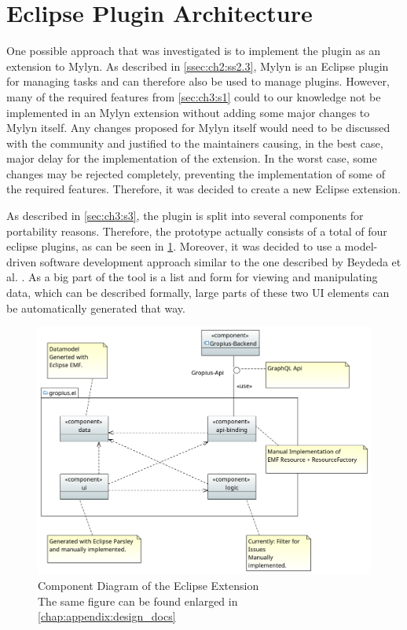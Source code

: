 \section{Eclipse Plugin Architecture}
\label{sec:ch4:s3}
One possible approach that was investigated is to implement the plugin as an extension to Mylyn.
As described in \cref{ssec:ch2:ss2.3}, Mylyn is an \gls{Eclipse} plugin for managing tasks and can therefore also be used to manage plugins.
However, many of the required features from \cref{sec:ch3:s1} could to our knowledge not be implemented in an Mylyn extension without adding some major changes to Mylyn itself.
Any changes proposed for Mylyn itself would need to be discussed with the community and justified to the maintainers causing, in the best case, major delay for the implementation of the extension.
In the worst case, some changes may be rejected completely, preventing the implementation of some of the required features.
Therefore, it was decided to create a new \gls{Eclipse} extension.

As described in \cref{sec:ch3:s3}, the plugin is split into several components for portability reasons.
Therefore, the prototype actually consists of a total of four eclipse plugins, as can be seen in \cref{fig:c4:component_diagram}.
Moreover, it was decided to use a model-driven software development approach similar to the one described by Beydeda et al. \cite{beydeda2005model}.
As a big part of the tool is a list and form for viewing and manipulating data, which can be described formally,
large parts of these two \gls{UI} elements can be automatically generated that way.

\begin{figure}[!h]
	\centering
	\includegraphics[width=\textwidth]{graphics/Component_Diagram.png}
	\caption{Component Diagram of the Eclipse Extension \\ \footnotesize{The same figure can be found enlarged in \cref{chap:appendix:design_docs}}}
	\label{fig:c4:component_diagram}
\end{figure}

